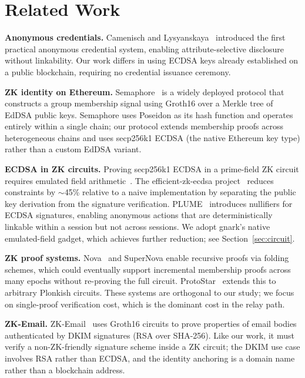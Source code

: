 \documentclass[conference]{IEEEtran}
\begin{document}
\section{Related Work}
\label{sec:related}

\textbf{Anonymous credentials.}
Camenisch and Lysyanskaya~\cite{CL2001} introduced the first practical
anonymous credential system, enabling attribute-selective disclosure
without linkability.
Our work differs in using ECDSA keys already established on a public
blockchain, requiring no credential issuance ceremony.

\textbf{ZK identity on Ethereum.}
Semaphore~\cite{Semaphore} is a widely deployed protocol that constructs
a group membership signal using Groth16 over a Merkle tree of EdDSA
public keys.
Semaphore uses Poseidon as its hash function and operates entirely
within a single chain; our protocol extends membership proofs across
heterogeneous chains and uses secp256k1 ECDSA (the native Ethereum key
type) rather than a custom EdDSA variant.

\textbf{ECDSA in ZK circuits.}
Proving secp256k1 ECDSA in a prime-field ZK circuit requires emulated
field arithmetic~\cite{Kravchenko2023}.
The efficient-zk-ecdsa project~\cite{EfficientECDSA} reduces constraints
by $\sim$45\% relative to a naive implementation by separating the
public key derivation from the signature verification.
PLUME~\cite{PLUME} introduces nullifiers for ECDSA signatures, enabling
anonymous actions that are deterministically linkable within a session
but not across sessions.
We adopt gnark's native emulated-field gadget, which achieves further
reduction; see Section~\ref{sec:circuit}.

\textbf{ZK proof systems.}
Nova~\cite{Nova} and SuperNova enable recursive proofs via folding
schemes, which could eventually support incremental membership proofs
across many epochs without re-proving the full circuit.
ProtoStar~\cite{ProtoStar} extends this to arbitrary Plonkish circuits.
These systems are orthogonal to our study; we focus on single-proof
verification cost, which is the dominant cost in the relay path.

\textbf{ZK-Email.}
ZK-Email~\cite{ZKEmail} uses Groth16 circuits to prove properties of
email bodies authenticated by DKIM signatures (RSA over SHA-256).
Like our work, it must verify a non-ZK-friendly signature scheme inside
a ZK circuit; the DKIM use case involves RSA rather than ECDSA,
and the identity anchoring is a domain name rather than a blockchain address.
\end{document}
